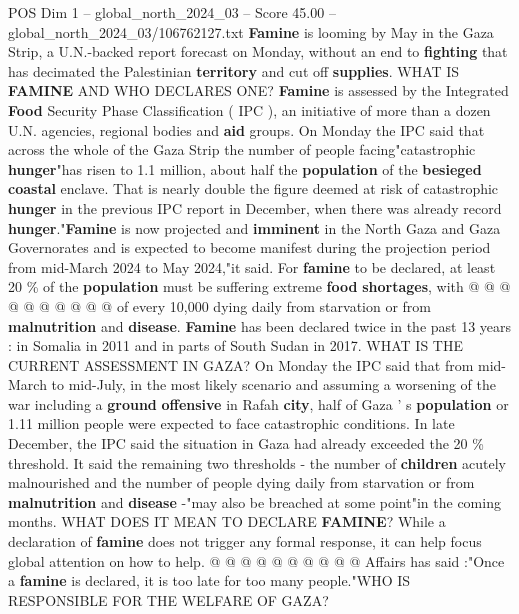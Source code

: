 \begin{textsample}{POS Dim 1 – global\_north\_2024\_03 – Score 45.00 – global\_north\_2024\_03/106762127.txt}  \label{ex:f1_pos_060}
\textbf{Famine} is looming by May in the Gaza Strip, a U.N.-backed report forecast on Monday, without an end to \textbf{fighting} that has decimated the Palestinian \textbf{territory} and cut off \textbf{supplies}.
WHAT IS \textbf{FAMINE} AND WHO DECLARES ONE? \textbf{Famine} is assessed by the Integrated \textbf{Food} Security Phase Classification ( IPC ), an initiative of more than a dozen U.N. agencies, regional bodies and \textbf{aid} groups.
On Monday the IPC said that across the whole of the Gaza Strip the number of people facing"catastrophic \textbf{hunger}"has risen to 1.1 million, about half the \textbf{population} of the \textbf{besieged} \textbf{coastal} enclave.
That is nearly double the figure deemed at risk of catastrophic \textbf{hunger} in the previous IPC report in December, when there was already record \textbf{hunger}."\textbf{Famine} is now projected and \textbf{imminent} in the North Gaza and Gaza Governorates and is expected to become manifest during the projection period from mid-March 2024 to May 2024,"it said.
For \textbf{famine} to be declared, at least 20 \% of the \textbf{population} must be suffering extreme \textbf{food} \textbf{shortages}, with @ @ @ @ @ @ @ @ @ @ of every 10,000 dying daily from starvation or from \textbf{malnutrition} and \textbf{disease}. \textbf{Famine} has been declared twice in the past 13 years : in Somalia in 2011 and in parts of South Sudan in 2017.
WHAT IS THE CURRENT ASSESSMENT IN GAZA?
On Monday the IPC said that from mid-March to mid-July, in the most likely scenario and assuming a worsening of the war including a \textbf{ground} \textbf{offensive} in Rafah \textbf{city}, half of Gaza ' s \textbf{population} or 1.11 million people were expected to face catastrophic conditions.
In late December, the IPC said the situation in Gaza had already exceeded the 20 \% threshold.
It said the remaining two thresholds - the number of \textbf{children} acutely malnourished and the number of people dying daily from starvation or from \textbf{malnutrition} and \textbf{disease} -"may also be breached at some point"in the coming months.
WHAT DOES IT MEAN TO DECLARE \textbf{FAMINE}?
While a declaration of \textbf{famine} does not trigger any formal response, it can help focus global attention on how to help. @ @ @ @ @ @ @ @ @ @ Affairs has said :"Once a \textbf{famine} is declared, it is too late for too many people."WHO IS RESPONSIBLE FOR THE WELFARE OF GAZA?

\end{textsample}
